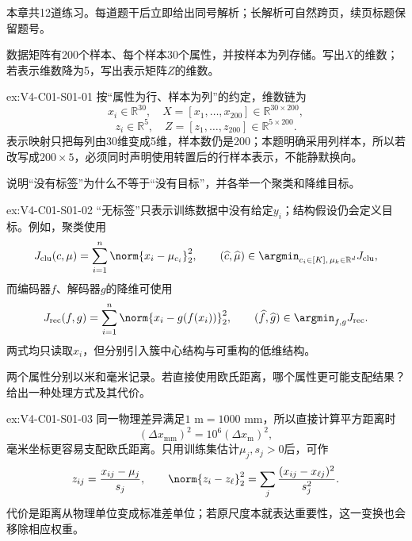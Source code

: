 \label{struct:V4-C01-CH34}
\begin{chapterexercisebox}
\label{struct:V4-C01-CH35}
本章共12道练习。每道题干后立即给出同号解析；长解析可自然跨页，续页标题保留题号。
\end{chapterexercisebox}

\begin{SLChapterExercisePairSection}

\begin{exercise}\label{ex:V4-C01-S01-01}
数据矩阵有$200$个样本、每个样本$30$个属性，并按样本为列存储。写出$X$的维数；若表示维数降为5，写出表示矩阵$Z$的维数。
\end{exercise}
\ifSLFullEdition
{}\label{sol:V4-C01-S01-01}
\begin{chapterexercisesolution}{ex:V4-C01-S01-01}
按“属性为行、样本为列”的约定，维数链为
\[
x_i\in\mathbb R^{30},\quad
X=[x_1,\ldots,x_{200}]\in\mathbb R^{30\times200},
\]
\[
z_i\in\mathbb R^{5},\quad
Z=[z_1,\ldots,z_{200}]\in\mathbb R^{5\times200}.
\]
表示映射只把每列由30维变成5维，样本数仍是200；本题明确采用列样本，所以若改写成$200\times5$，必须同时声明使用转置后的行样本表示，不能静默换向。
\end{chapterexercisesolution}
\fi

\begin{exercise}\label{ex:V4-C01-S01-02}
说明“没有标签”为什么不等于“没有目标”，并各举一个聚类和降维目标。
\end{exercise}
\ifSLFullEdition
{}\label{sol:V4-C01-S01-02}
\begin{chapterexercisesolution}{ex:V4-C01-S01-02}
“无标签”只表示训练数据中没有给定$y_i$；结构假设仍会定义目标。例如，\kMeans{}聚类使用
\[
J_{\mathrm{clu}}(c,\mu)
=\sum_{i=1}^{n}\norm{x_i-\mu_{c_i}}_2^2,
\qquad
(\widehat c,\widehat\mu)\in\argmin_{c_i\in[K],\,\mu_k\in\mathbb R^d}J_{\mathrm{clu}},
\]
而编码器$f$、解码器$g$的降维可使用
\[
J_{\mathrm{rec}}(f,g)
=\sum_{i=1}^{n}\norm{x_i-g(f(x_i))}_2^2,
\qquad
(\widehat f,\widehat g)\in\argmin_{f,g}J_{\mathrm{rec}}.
\]
两式均只读取$x_i$，但分别引入簇中心结构与可重构的低维结构。
\end{chapterexercisesolution}
\fi

\begin{exercise}\label{ex:V4-C01-S01-03}
两个属性分别以米和毫米记录。若直接使用欧氏距离，哪个属性更可能支配结果？给出一种处理方式及其代价。
\end{exercise}
\ifSLFullEdition
{}\label{sol:V4-C01-S01-03}
\begin{chapterexercisesolution}{ex:V4-C01-S01-03}
同一物理差异满足$1\text{ m}=1000\text{ mm}$，所以直接计算平方距离时
\[
(\Delta x_{\mathrm{mm}})^2
=10^6(\Delta x_{\mathrm m})^2,
\]
毫米坐标更容易支配欧氏距离。只用训练集估计$\mu_j,s_j>0$后，可作
\[
z_{ij}=\frac{x_{ij}-\mu_j}{s_j},
\qquad
\norm{z_i-z_\ell}_2^2
=\sum_j\frac{(x_{ij}-x_{\ell j})^2}{s_j^2}.
\]
代价是距离从物理单位变成标准差单位；若原尺度本就表达重要性，这一变换也会移除相应权重。
\end{chapterexercisesolution}
\fi


\end{SLChapterExercisePairSection}
